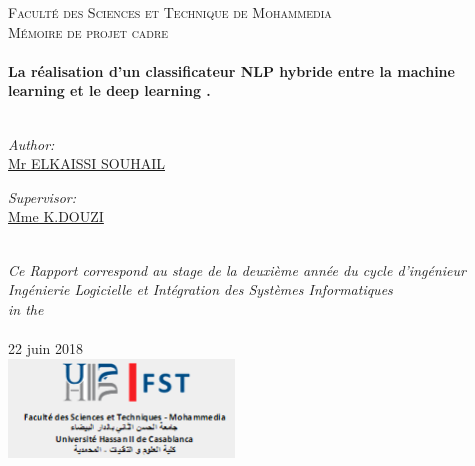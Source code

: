 \documentclass[11pt, oneside]{Thesis} %
\begin{document}
\begin{titlepage}
\begin{center}

\textsc{\LARGE Faculté des Sciences et Technique de Mohammedia}\\[1.5cm] %
\textsc{\Large Mémoire de projet cadre}\\[0.5cm] %

\HRule \\[0.4cm] %
{\huge \bfseries La réalisation d'un classificateur NLP hybride entre la machine learning et le deep learning .}\\[0.4cm] %
\HRule \\[1.5cm] %
 
\begin{minipage}{0.4\textwidth}
\begin{flushleft} \large
\emph{Author:}\\
\href{https://www.uel.ac.uk}{Mr ELKAISSI SOUHAIL} \\%
\end{flushleft}
\end{minipage}
\begin{minipage}{0.4\textwidth}
\begin{flushright} \large
\emph{Supervisor:} \\
\href{https://www.uel.ac.uk}{Mme K.DOUZI} %
\end{flushright}
\end{minipage}\\[3cm]
 
\large \textit{Ce Rapport correspond au stage de la deuxième année du cycle d'ingénieur Ingénierie Logicielle et Intégration des Systèmes Informatiques }\\[0.3cm] %
\textit{in the}\\[0.4cm]

\deptname\\[2cm] %
{\large 22 juin 2018}\\[1cm] %
\includegraphics[width=6cm]{./Images/logo.png} %
 
\vfill
\end{center}

\end{titlepage}
\end{document}
